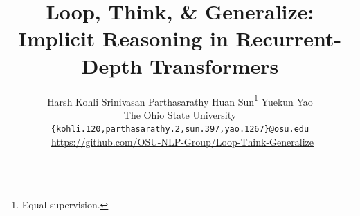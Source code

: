 \documentclass{article} %
\title{Loop, Think, \& Generalize: Implicit Reasoning in Recurrent-Depth Transformers}
\author{
Harsh Kohli \hspace{1.1em} Srinivasan Parthasarathy \hspace{1.1em} Huan Sun\thanks{Equal supervision.} \hspace{1.1em} Yuekun Yao\footnotemark[1] \\
The Ohio State University\\
\texttt{\{kohli.120,parthasarathy.2,sun.397,yao.1267\}@osu.edu} \\ [0.2em]
\small \faGithub\ \url{https://github.com/OSU-NLP-Group/Loop-Think-Generalize}
}
\newcommand{\hs}[1]{\textcolor{red}{[Huan: #1]}}
\begin{document}
\ifcolmsubmission
\linenumbers
\fi

\maketitle

\end{document}
